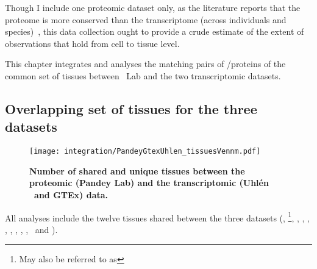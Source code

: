 
Though I include one proteomic dataset only,
as the literature reports that
the proteome is more conserved than the transcriptome
(across individuals and species)~,
this data collection ought to provide
a crude estimate of the extent of observations
that hold from cell to tissue level.\mybr\

This chapter integrates and analyses the matching pairs of \mRNA/proteins
of the common set of tissues between \pandey\ Lab
and the two transcriptomic datasets.\mybr\

\subsection{Overlapping set of tissues for the three datasets}

\begin{figure}[!htbp]
    \texttt{[image: integration/PandeyGtexUhlen\_tissuesVennm.pdf]}
    \centering
    \caption[Number of shared and unique tissues between the proteomic
    dataset from Pandey Lab and the transcriptomic datasets (Uhlén \etal\ and
    Gtex)]{\label{fig:VennTissuePandeyGtexUhlen}\textbf{Number of shared and unique
    tissues between the proteomic (Pandey Lab) and the
    transcriptomic (Uhlén \etal\ and GTEx) data.} %
    }
\end{figure}

All analyses include the twelve tissues shared between the three
datasets (\adrenal, \Bladder{}\footnote{May also
be referred to as },
\hColon, \Oesophagus, \Heart,
\Kidney, \Liver, \Lung, \Ovary, \Pancreas,
\Prostate\ and \Testis).\mybr\

